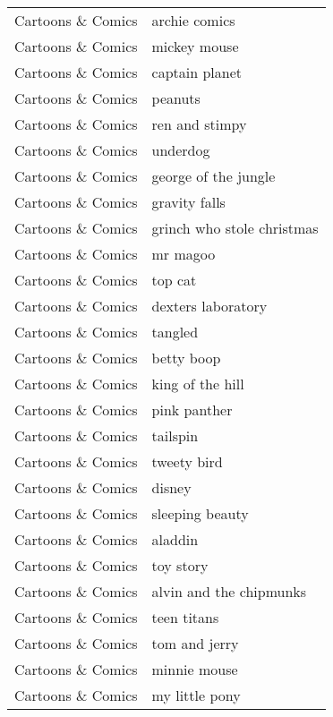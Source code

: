 \begin{supertabular}{l p{0.25\textwidth}}
Cartoons \& Comics &                      archie comics \\
Cartoons \& Comics &                       mickey mouse \\
Cartoons \& Comics &                     captain planet \\
Cartoons \& Comics &                            peanuts \\
Cartoons \& Comics &                     ren and stimpy \\
Cartoons \& Comics &                           underdog \\
Cartoons \& Comics &               george of the jungle \\
Cartoons \& Comics &                      gravity falls \\
Cartoons \& Comics &         grinch who stole christmas \\
Cartoons \& Comics &                           mr magoo \\
Cartoons \& Comics &                            top cat \\
Cartoons \& Comics &                 dexters laboratory \\
Cartoons \& Comics &                            tangled \\
Cartoons \& Comics &                         betty boop \\
Cartoons \& Comics &                   king of the hill \\
Cartoons \& Comics &                       pink panther \\
Cartoons \& Comics &                           tailspin \\
Cartoons \& Comics &                        tweety bird \\
Cartoons \& Comics &                             disney \\
Cartoons \& Comics &                    sleeping beauty \\
Cartoons \& Comics &                            aladdin \\
Cartoons \& Comics &                          toy story \\
Cartoons \& Comics &            alvin and the chipmunks \\
Cartoons \& Comics &                        teen titans \\
Cartoons \& Comics &                      tom and jerry \\
Cartoons \& Comics &                       minnie mouse \\
Cartoons \& Comics &                     my little pony \\

\end{supertabular}
